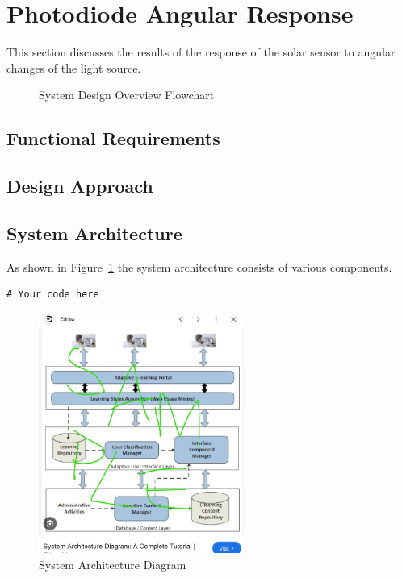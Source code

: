 \section{Photodiode Angular Response}
This section discusses the results of the response of the solar sensor to angular changes of the light source.

\begin{figure}[H]
    \centering
    \scalebox{0.8}{ %
        
    }
    \caption{System Design Overview Flowchart}
    \label{fig:decriptiveLabel3} %
\end{figure}

\subsection{Functional Requirements}

\subsection{Design Approach}

\subsection{System Architecture}
As shown in Figure~\ref{fig:decriptiveLabel3} the system architecture consists of various components.

\begin{lstlisting}[style=cstyle, caption=System Architecture Code Example, label=lst:SystemArchitecture3]
# Your code here
\end{lstlisting}

\begin{figure}[htbp] %
    \centering
    \includegraphics[width=0.6\textwidth]{figures/results/system_architecture.jpg}
    \caption{System Architecture Diagram}
    \label{fig:system-architecture23}
\end{figure}